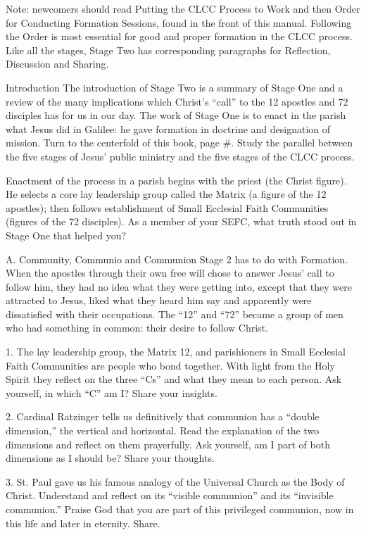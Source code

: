\documentclass[oneside]{book}
\begin{document}
Note:  newcomers should read Putting the CLCC Process to Work and then Order for
Conducting Formation Sessions, found in the front of this manual. Following the
Order is most essential for good and proper formation in the CLCC process. Like
all the stages, Stage Two has corresponding paragraphs for Reflection,
Discussion and Sharing.

Introduction
The introduction of Stage Two is a summary of Stage One and a review of the many
implications which Christ's ``call'' to the 12 apostles and 72 disciples has for
us in our day. The work of Stage One is to enact in the parish what Jesus did in
Galilee: he gave formation in doctrine and designation of mission. Turn to the
centerfold of this book, page \#. Study the parallel between the five stages of
Jesus' public ministry and the five stages of the CLCC process.

Enactment of the process in a parish begins with the priest (the Christ
figure). He selects a core lay leadership group called the Matrix (a figure of
the 12 apostles); then follows establishment of Small Ecclesial Faith
Communities (figures of the 72 disciples).  As a member of your SEFC, what truth
stood out in Stage One that helped you?

A. Community, Communio and Communion
Stage 2 has to do with Formation. When the apostles through their own free will
chose to answer Jesus' call to follow him, they had no idea what they were
getting into, except that they were attracted to Jesus, liked what they heard
him say and apparently were dissatisfied with their occupations.  The ``12'' and
``72'' became a group of men who had something in common: their desire to follow
Christ.

1. The lay leadership group, the Matrix 12, and parishioners in Small Ecclesial
Faith Communities are people who bond together. With light from the Holy Spirit
they reflect on the three ``Cs'' and what they mean to each person. Ask
yourself, in which ``C'' am I? Share your insights.

2. Cardinal Ratzinger tells us definitively that communion has a ``double
dimension,'' the vertical and horizontal. Read the explanation of the two
dimensions and reflect on them prayerfully. Ask yourself, am I part of both
dimensions as I should be? Share your thoughts.

3. St. Paul gave us his famous analogy of the Universal Church as the Body of
Christ. Understand and reflect on its ``visible communion'' and its ``invisible
communion.'' Praise God that you are part of this privileged communion, now in
this life and later in eternity. Share.
\end{document}
